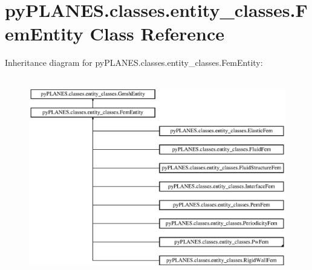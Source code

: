 \hypertarget{classpy_p_l_a_n_e_s_1_1classes_1_1entity__classes_1_1_fem_entity}{}\section{py\+P\+L\+A\+N\+E\+S.\+classes.\+entity\+\_\+classes.\+Fem\+Entity Class Reference}
\label{classpy_p_l_a_n_e_s_1_1classes_1_1entity__classes_1_1_fem_entity}
Inheritance diagram for py\+P\+L\+A\+N\+E\+S.\+classes.\+entity\+\_\+classes.\+Fem\+Entity\+:\begin{figure}[H]
\begin{center}
\leavevmode
\includegraphics[height=8.750000cm]{classpy_p_l_a_n_e_s_1_1classes_1_1entity__classes_1_1_fem_entity}
\end{center}
\end{figure}
